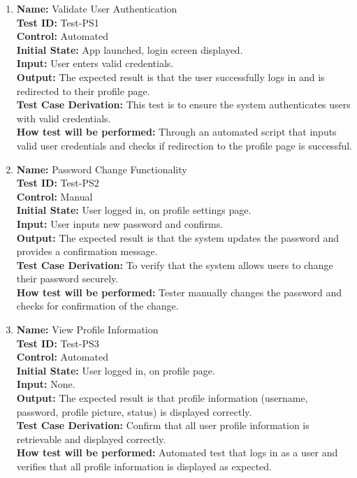 \documentclass[12pt, titlepage]{article}
\begin{document}
\begin{enumerate}
    \item \textbf{Name:} {Validate User Authentication} \label{itm:Test-PS1}\\
    \textbf{Test ID:} Test-PS1\\
    \textbf{Control:} Automated \\
    \textbf{Initial State:} App launched, login screen displayed. \\
    \textbf{Input:} User enters valid credentials. \\
    \textbf{Output:} The expected result is that the user successfully logs in and is redirected to their profile page. \\
    \textbf{Test Case Derivation:} This test is to ensure the system authenticates users with valid credentials.\\
    \textbf{How test will be performed:} Through an automated script that inputs valid user credentials and checks if redirection to the profile page is successful.

    \item \textbf{Name:} {Password Change Functionality} \label{itm:Test-PS2}\\
    \textbf{Test ID:} Test-PS2\\
    \textbf{Control:} Manual \\
    \textbf{Initial State:} User logged in, on profile settings page. \\
    \textbf{Input:} User inputs new password and confirms. \\
    \textbf{Output:} The expected result is that the system updates the password and provides a confirmation message. \\
    \textbf{Test Case Derivation:} To verify that the system allows users to change their password securely. \\
    \textbf{How test will be performed:} Tester manually changes the password and checks for confirmation of the change.

    \item \textbf{Name:} {View Profile Information} \label{itm:Test-PS3}\\
    \textbf{Test ID:} Test-PS3\\
    \textbf{Control:} Automated \\
    \textbf{Initial State:} User logged in, on profile page. \\
    \textbf{Input:} None. \\
    \textbf{Output:} The expected result is that profile information (username, password, profile picture, status) is displayed correctly. \\
    \textbf{Test Case Derivation:} Confirm that all user profile information is retrievable and displayed correctly. \\
    \textbf{How test will be performed:} Automated test that logs in as a user and verifies that all profile information is displayed as expected.


\end{enumerate}
\end{document}
